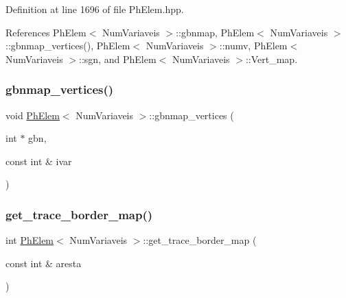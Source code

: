 Definition at line 1696 of file Ph\+Elem.\+hpp.



References Ph\+Elem$<$ Num\+Variaveis $>$\+::gbnmap, Ph\+Elem$<$ Num\+Variaveis $>$\+::gbnmap\+\_\+vertices(), Ph\+Elem$<$ Num\+Variaveis $>$\+::numv, Ph\+Elem$<$ Num\+Variaveis $>$\+::sgn, and Ph\+Elem$<$ Num\+Variaveis $>$\+::\+Vert\+\_\+map.

\mbox{\label{classPhElem_a75f80b321d33ea208ae2d35af1b8c4df}} 
\subsubsection{\texorpdfstring{gbnmap\+\_\+vertices()}{gbnmap\_vertices()}\hspace{0.1cm}{\footnotesize\ttfamily [2/2]}}
{\footnotesize\ttfamily void \hyperlink{classPhElem}{Ph\+Elem}$<$ Num\+Variaveis $>$\+::gbnmap\+\_\+vertices (\begin{DoxyParamCaption}\item[{int $\ast$}]{gbn,  }\item[{const int \&}]{ivar }\end{DoxyParamCaption})\hspace{0.3cm}{\ttfamily [inherited]}}

\mbox{\label{classPhElem_a35508e257e1675a912954f83cb4b6a3e}} 
\subsubsection{\texorpdfstring{get\+\_\+trace\+\_\+border\+\_\+map()}{get\_trace\_border\_map()}}
{\footnotesize\ttfamily int \hyperlink{classPhElem}{Ph\+Elem}$<$ Num\+Variaveis $>$\+::get\+\_\+trace\+\_\+border\+\_\+map (\begin{DoxyParamCaption}\item[{const int \&}]{aresta }\end{DoxyParamCaption})\hspace{0.3cm}{\ttfamily [inherited]}}



